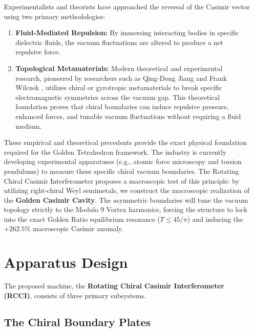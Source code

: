 \documentclass[12pt,oneside]{article}
\theoremstyle{principia}
\theoremstyle{definition}
\theoremstyle{remark}
\begin{document}
Experimentalists and theorists have approached the reversal of the Casimir vector using two primary methodologies:
\begin{enumerate}
    \item \textbf{Fluid-Mediated Repulsion:} By immersing interacting bodies in specific dielectric fluids, the vacuum fluctuations are altered to produce a net repulsive force.
    \item \textbf{Topological Metamaterials:} Modern theoretical and experimental research, pioneered by researchers such as Qing-Dong Jiang and Frank Wilczek \cite{jiang_wilczek2019}, utilizes chiral or gyrotropic metamaterials to break specific electromagnetic symmetries across the vacuum gap. This theoretical foundation proves that chiral boundaries can induce repulsive pressure, enhanced forces, and tunable vacuum fluctuations without requiring a fluid medium.
\end{enumerate}

These empirical and theoretical precedents provide the exact physical foundation required for the Golden Tetrahedron framework. The industry is currently developing experimental apparatuses (e.g., atomic force microscopy and torsion pendulums) to measure these specific chiral vacuum boundaries. The Rotating Chiral Casimir Interferometer proposes a macroscopic test of this principle: by utilizing right-chiral Weyl semimetals, we construct the macroscopic realization of the \textbf{Golden Casimir Cavity}. The asymmetric boundaries will tune the vacuum topology strictly to the Modulo 9 Vortex harmonics, forcing the structure to lock into the exact Golden Ratio equilibrium resonance ($\Upsilon \le 45/\pi$) and inducing the $+262.5\%$ macroscopic Casimir anomaly.

\section{Apparatus Design}\label{sec:design}

The proposed machine, the \textbf{Rotating Chiral Casimir Interferometer (RCCI)}, consists of three primary subsystems.

\subsection{The Chiral Boundary Plates}\label{sec:plates}
\end{document}
